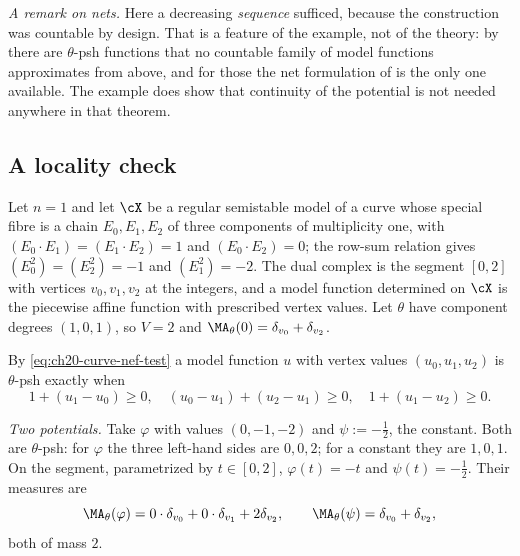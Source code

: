 \begin{example}
\emph{A remark on nets.}  Here a decreasing \emph{sequence} sufficed,
because the construction was countable by design.  That is a feature of the
example, not of the theory: by
 there are \(\theta\)-psh functions that
no countable family of model functions approximates from above, and for
those the net formulation of  is the only one
available.  The example does show that continuity of the potential is not
needed anywhere in that theorem.
\end{example}

\subsection{A locality check}
\label{sec:ch24-ex-locality}

\begin{example}
\label{ex:ch24-locality-check}
Let \(n=1\) and let \(\cX\) be a regular semistable model of a curve whose
special fibre is a chain \(E_0,E_1,E_2\) of three components of
multiplicity one, with \((E_0\cdot E_1)=(E_1\cdot E_2)=1\) and
\((E_0\cdot E_2)=0\); the row-sum relation gives
\((E_0^2)=(E_2^2)=-1\) and \((E_1^2)=-2\).  The dual complex is the segment
\([0,2]\) with vertices \(v_0,v_1,v_2\) at the integers, and a model
function determined on \(\cX\) is the piecewise affine function with
prescribed vertex values.  Let \(\theta\) have component degrees
\((1,0,1)\), so \(V=2\) and \(\MA_\theta(0)=\delta_{v_0}+\delta_{v_2}\).

By \eqref{eq:ch20-curve-nef-test} a model function \(u\) with vertex values
\((u_0,u_1,u_2)\) is \(\theta\)-psh exactly when
\[
 1+(u_1-u_0)\geq0,
 \quad
 (u_0-u_1)+(u_2-u_1)\geq0,
 \quad
 1+(u_1-u_2)\geq0 .
\]

\emph{Two potentials.}  Take \(\varphi\) with values \((0,-1,-2)\) and
\(\psi:=-\tfrac12\), the constant.  Both are \(\theta\)-psh: for
\(\varphi\) the three left-hand sides are \(0,0,2\); for a constant they are
\(1,0,1\).  On the segment, parametrized by \(t\in[0,2]\),
\(\varphi(t)=-t\) and \(\psi(t)=-\tfrac12\).  Their measures are
\[
 \MA_\theta(\varphi)=0\cdot\delta_{v_0}+0\cdot\delta_{v_1}+2\delta_{v_2},
 \qquad
 \MA_\theta(\psi)=\delta_{v_0}+\delta_{v_2},
\]
both of mass \(2\).


\end{example}
